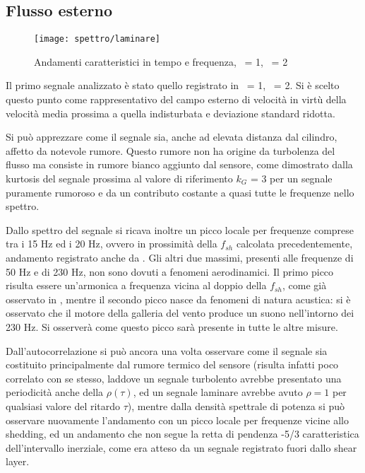 \documentclass{article} %
\newcommand{\xd}{\nicefrac{\textrm{x}}{\textrm{D}}\ }
\newcommand{\yd}{\nicefrac{\textrm{y}}{\textrm{D}}\ }
\begin{document}
\subsection{Flusso esterno}
\begin{figure}[h]
	\texttt{[image: spettro/laminare]}
	\caption{Andamenti caratteristici in tempo e frequenza, \xd = 1, \yd = 2}
\end{figure}
Il primo segnale analizzato è stato quello registrato in \xd = 1, \yd = 2. Si è scelto questo punto come rappresentativo del campo esterno di velocità in virtù della velocità media prossima a quella indisturbata e deviazione standard ridotta.\par
Si può apprezzare come il segnale sia, anche ad elevata distanza dal cilindro, affetto da notevole rumore. Questo rumore non ha origine da turbolenza del flusso ma consiste in rumore bianco aggiunto dal sensore, come dimostrato dalla kurtosis del segnale prossima al valore di riferimento $k_G$ = 3 per un segnale puramente rumoroso e da un contributo costante a quasi tutte le frequenze nello spettro.\par
Dallo spettro del segnale si ricava inoltre un picco locale per frequenze comprese tra i 15 Hz ed i 20 Hz, ovvero in prossimità della $f_{sh}$ calcolata precedentemente, andamento registrato anche da \cite[fig.~2b]{braza06}. Gli altri due massimi, presenti alle frequenze di 50 Hz e di 230 Hz, non sono dovuti a fenomeni aerodinamici. Il primo picco risulta essere un'armonica a frequenza vicina al doppio della $f_{sh}$, come già osservato in \cite[pag.~351]{roshko61}, mentre il secondo picco nasce da fenomeni di natura acustica: si è osservato che il motore della galleria del vento produce un suono nell'intorno dei 230 Hz. Si osserverà come questo picco sarà presente in tutte le altre misure.\par
Dall'autocorrelazione si può ancora una volta osservare come il segnale sia costituito principalmente dal rumore termico del sensore (risulta infatti poco correlato con se stesso, laddove un segnale turbolento avrebbe presentato una periodicità anche della $\rho(\tau)$, ed un segnale laminare avrebbe avuto $\rho = 1$ per qualsiasi valore del ritardo $\tau$), mentre dalla densità spettrale di potenza si può osservare nuovamente l'andamento con un picco locale per frequenze vicine allo shedding, ed un andamento che non segue la retta di pendenza -5/3 caratteristica dell'intervallo inerziale, come era atteso da un segnale registrato fuori dallo shear layer.
\end{document}
